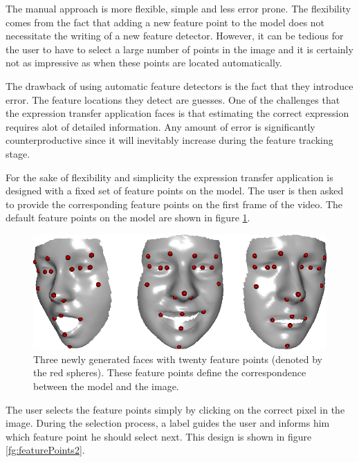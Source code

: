 \documentclass[11pt,a4paper]{report}
\begin{document}
The manual approach is more flexible, simple and less error prone. The
flexibility comes from the fact that adding a new feature point to the model
does not necessitate the writing of a new feature detector. However, it can be
tedious for the user to have to select a large number of points in the image and
it is certainly not as impressive as when these points are located
automatically. 

The drawback of using automatic feature detectors is the fact that they
introduce error. The feature locations they detect are guesses. One of the
challenges that the expression transfer application faces is that estimating the
correct expression requires alot of detailed information. Any amount of error is
significantly counterproductive since it will inevitably increase during the
feature tracking stage.

For the sake of flexibility and simplicity the expression transfer application
is designed with a fixed set of feature points on the model. The user is then
asked to provide the corresponding feature points on the first frame of the
video. The default feature points on the model are shown in figure
\ref{fg:featurePoints}.

\begin{figure}[H]
\begin{centering}
\includegraphics[scale=0.40]{images/featurePoints.png}
\par\end{centering}

\caption{Three newly generated faces with twenty feature points (denoted by the
  red spheres). These feature points define the correspondence between the model
  and the image.}
\label{fg:featurePoints}
\end{figure}

The user selects the feature points simply by clicking on the correct pixel in
the image. During the selection process, a label guides the user and informs
him which feature point he should select next. This design is shown in figure
\ref{fg:featurePoints2}.
\end{document}

